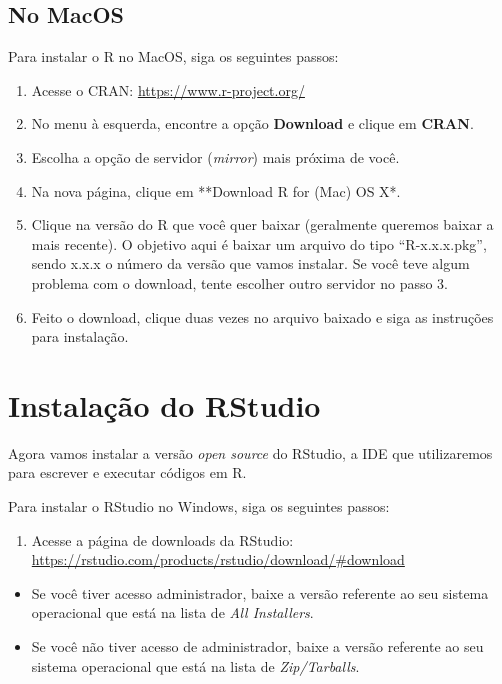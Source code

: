 \documentclass[
]{book}
\providecommand{\tightlist}{%
  \setlength{\itemsep}{0pt}\setlength{\parskip}{0pt}}
\begin{document}
\hypertarget{no-macos}{%
\subsection{No MacOS}\label{no-macos}}

Para instalar o R no MacOS, siga os seguintes passos:

\begin{enumerate}
\def\labelenumi{\arabic{enumi}.}
\item
  Acesse o CRAN: \url{https://www.r-project.org/}
\item
  No menu à esquerda, encontre a opção \textbf{Download} e clique em \textbf{CRAN}.
\item
  Escolha a opção de servidor (\emph{mirror}) mais próxima de você.
\item
  Na nova página, clique em **Download R for (Mac) OS X*.
\item
  Clique na versão do R que você quer baixar (geralmente queremos baixar a mais recente). O objetivo aqui é baixar um arquivo do tipo ``R-x.x.x.pkg'', sendo x.x.x o número da versão que vamos instalar. Se você teve algum problema com o download, tente escolher outro servidor no passo 3.
\item
  Feito o download, clique duas vezes no arquivo baixado e siga as instruções para instalação.
\end{enumerate}

\hypertarget{instalacao-do-rstudio}{%
\section{Instalação do RStudio}\label{instalacao-do-rstudio}}

Agora vamos instalar a versão \emph{open source} do RStudio, a IDE que utilizaremos para escrever e executar códigos em R.

Para instalar o RStudio no Windows, siga os seguintes passos:

\begin{enumerate}
\def\labelenumi{\arabic{enumi}.}
\tightlist
\item
  Acesse a página de downloads da RStudio: \url{https://rstudio.com/products/rstudio/download/\#download}
\end{enumerate}

\begin{itemize}
\item
  Se você tiver acesso administrador, baixe a versão referente ao seu sistema operacional que está na lista de \emph{All Installers}.
\item
  Se você não tiver acesso de administrador, baixe a versão referente ao seu sistema operacional que está na lista de \emph{Zip/Tarballs}.
\end{itemize}
\end{document}
